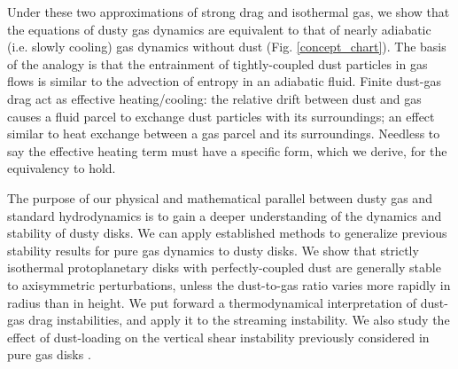 \documentclass[iop, numberedappendix]{emulateapj}
\newcommand{\rhog}{\rho_\mathrm{g}}
\newcommand{\tstop}{t_\mathrm{s}}
\begin{document}

 

Under these two approximations of strong drag and isothermal gas, we show that the equations of 
 dusty gas dynamics are equivalent to that of nearly adiabatic (i.e. slowly cooling) gas
dynamics without dust (Fig. \ref{concept_chart}).  The basis of the analogy is that the entrainment 
of tightly-coupled dust particles in gas flows is similar to the advection
of entropy in an adiabatic fluid. %
Finite dust-gas drag act as effective heating/cooling: the relative
drift between dust and gas causes a fluid parcel to exchange dust
particles with its surroundings; an effect similar to heat exchange
between a gas parcel and its surroundings.   Needless to say the effective heating term must have a 
specific form, which we derive, for the equivalency to hold.


The purpose of our physical and mathematical parallel between
dusty gas and standard hydrodynamics is to gain a deeper understanding of the dynamics
and stability of dusty disks.  
We can apply established methods to generalize previous stability 
results for pure gas dynamics to dusty disks.  
We show that strictly isothermal protoplanetary disks with
perfectly-coupled dust are generally 
stable to axisymmetric perturbations, unless the 
dust-to-gas ratio varies more rapidly in radius than in height.  
We put forward a thermodynamical interpretation of 
dust-gas drag instabilities, and apply it to the streaming instability.   
We also study the effect of dust-loading on the vertical shear
instability previously considered in pure gas disks
\citep[VSI,][]{nelson13,lin15,barker15}.  
\end{document}
